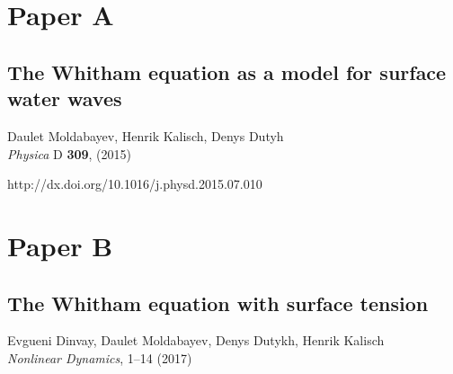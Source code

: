 

\chapter*{Paper A}

\section*{The Whitham equation as a model for surface water waves}

\noindent Daulet Moldabayev, Henrik Kalisch, Denys Dutyh \\

\noindent \textit{Physica} D \textbf{309}, (2015)

\noindent http://dx.doi.org/10.1016/j.physd.2015.07.010
\cleardoublepage



\chapter*{Paper B}

\section*{The Whitham equation with surface tension}

\noindent Evgueni Dinvay, Daulet Moldabayev, Denys Dutykh, Henrik Kalisch\\

\noindent \textit{Nonlinear Dynamics}, 1--14 (2017)

